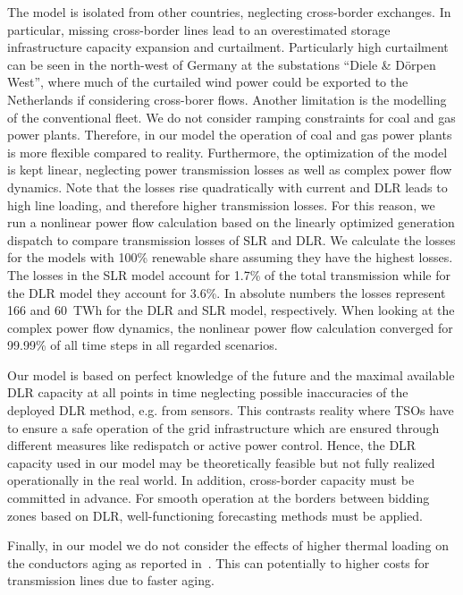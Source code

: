 \documentclass[preprint,12pt]{elsarticle}
\begin{document}
The model is isolated from other countries, neglecting cross-border exchanges.
In particular, missing cross-border lines lead to an overestimated storage infrastructure capacity expansion and curtailment.
Particularly high curtailment can be seen in the north-west of Germany at the substations ``Diele \& Dörpen West'', where much of the curtailed wind power could be exported to the Netherlands if considering cross-borer flows.
Another limitation is the modelling of the conventional fleet. We do not consider ramping constraints for coal and gas power plants. Therefore, in our model the operation of coal and gas power plants is more flexible compared to reality.
Furthermore, the optimization of the model is kept linear, neglecting power transmission losses as well as complex power flow dynamics.
Note that the losses rise quadratically with current and DLR leads to high line loading, and therefore higher transmission losses.
For this reason, we run a nonlinear power flow calculation based on the linearly optimized generation dispatch to compare transmission losses of SLR and DLR.
We calculate the losses for the models with 100\% renewable share assuming they have the highest losses.
The losses in the SLR model account for 1.7\% of the total transmission while for the DLR model they account for 3.6\%.
In absolute numbers the losses represent 166 and 60~TWh for the DLR and SLR model, respectively.
When looking at the complex power flow dynamics, the nonlinear power flow calculation converged for 99.99\% of all time steps in all regarded scenarios.

Our model is based on perfect knowledge of the future and the maximal available DLR capacity at all points in time neglecting possible inaccuracies of the deployed DLR method, e.g. from sensors.
This contrasts reality where TSOs have to ensure a safe operation of the grid infrastructure which are ensured through different measures like redispatch or active power control.
Hence, the DLR capacity used in our model may be theoretically feasible but not fully realized operationally in the real world.
In addition, cross-border capacity must be committed in advance.
For smooth operation at the borders between bidding zones based on DLR, well-functioning forecasting methods must be applied.

Finally, in our model we do not consider the effects of higher thermal loading on the conductors aging as reported in~\cite{tehImpactRealTimeThermal2017}. This can potentially to higher costs for transmission lines due to faster aging.
\end{document}
